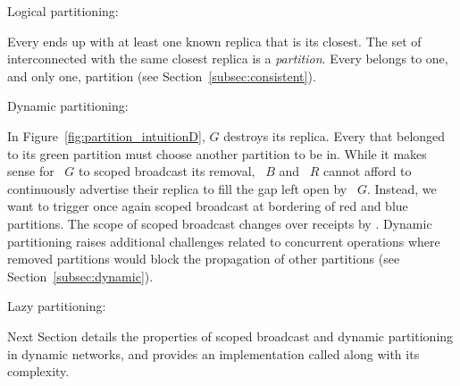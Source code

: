 \begin{asparadesc}
\item [Logical partitioning:]

Every \process ends up with at least one known replica that is its
closest. The set of interconnected \processes with the same closest
replica is a \emph{partition}. Every \process belongs to one, and only
one, partition (see Section~\ref{subsec:consistent}).


\item [Dynamic partitioning:]

In Figure~\ref{fig:partition_intuitionD}, \Process $G$ destroys its
replica. Every \process that belonged to its green partition must
choose another partition to be in. While it makes sense for
\Process~$G$ to scoped broadcast its removal, \Process~$B$ and
\Process~$R$ cannot afford to continuously advertise their replica to
fill the gap left open by \Process~$G$. Instead, we want to trigger
once again scoped broadcast at bordering \processes of red and blue
partitions. The scope of scoped broadcast changes over receipts by
\processes. Dynamic partitioning raises additional challenges related
to concurrent operations where removed partitions would block the
propagation of other partitions (see Section~\ref{subsec:dynamic}).

\item [Lazy partitioning:]
  

\end{asparadesc}

Next Section details the properties of scoped broadcast and dynamic
partitioning in dynamic networks, and provides an implementation
called \NAME along with its complexity.


